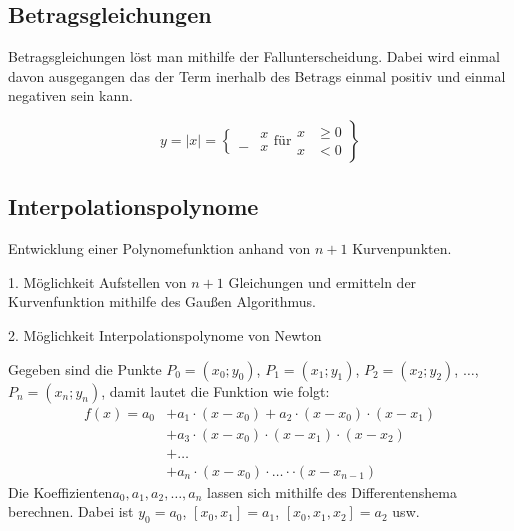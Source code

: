 \subsection{Betragsgleichungen}
Betragsgleichungen löst man mithilfe der Fallunterscheidung. Dabei wird einmal davon ausgegangen das der Term inerhalb des Betrags einmal positiv und einmal negativen
sein kann.   
\begin{shaded}
\begin{equation}
y=|x|=\left\{
\begin{aligned}
  &x \\
- &x 
\end{aligned}
\right. \text{für} \left. \begin{aligned}
x &\geq 0 \\
x &< 0 
\end{aligned} \right\} 
\end{equation}
\end{shaded}

\subsection{Interpolationspolynome}
Entwicklung einer Polynomefunktion anhand von $n+1$ Kurvenpunkten.
\begin{description*}
 \item[1. Möglichkeit] Aufstellen von $n+1$ Gleichungen und ermitteln der Kurvenfunktion mithilfe des Gaußen Algorithmus.
 \item[2. Möglichkeit] Interpolationspolynome von Newton
\end{description*}


\begin{merkbox}Gegeben sind die Punkte $P_0=(x_0;y_0)$, $P_1=(x_1;y_1)$, $P_2=(x_2;y_2)$, $\ldots$, $P_n=(x_n;y_n)$, damit lautet die Funktion wie folgt:
\begin{align}
 f(x)=a_0&+a_1\cdot (x-x_0)+ a_2\cdot (x-x_0)\cdot(x-x_1)\\
	 &+a_3\cdot(x-x_0)\cdot(x-x_1)\cdot(x-x_2)\\
	 &+\ldots\\
	 &+a_n\cdot(x-x_0)\cdot\ldots\cdot\cdot(x-x_{n-1})
\end{align}
Die Koeffizienten$a_0, a_1, a_2,\ldots, a_n$ lassen sich mithilfe des Differentenshema berechnen. Dabei ist $y_0=a_0$, $[x_0,x_1]=a_1$, $[x_0,x_1,x_2]=a_2$
 usw. 
\end{merkbox}


